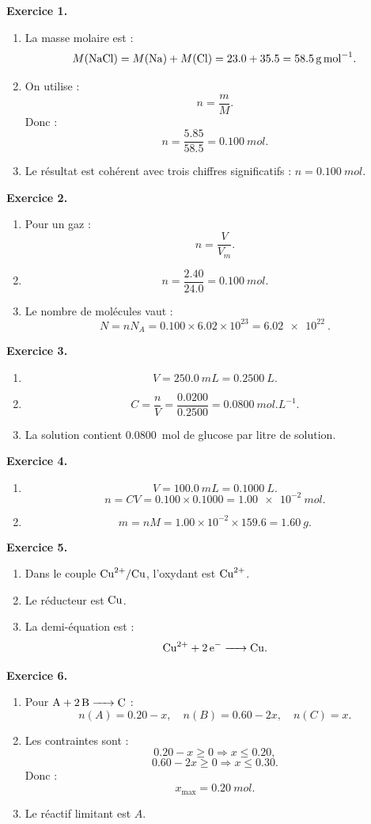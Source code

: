 \documentclass[11pt,a4paper]{article}
\newcommand{\corr}[2]{
  \begin{correctionbox}
  \textbf{Exercice #1.} #2
  \end{correctionbox}
}
\begin{document}
\corr{1}{
\begin{enumerate}
  \item La masse molaire est :
  \[
  M(\ce{NaCl})=M(\ce{Na})+M(\ce{Cl})=23.0+35.5=\SI{58.5}{g.mol^{-1}}.
  \]
  \item On utilise :
  \[
  n=\frac{m}{M}.
  \]
  Donc :
  \[
  n=\frac{5.85}{58.5}=\SI{0.100}{mol}.
  \]
  \item Le résultat est cohérent avec trois chiffres significatifs : $n=\SI{0.100}{mol}$.
\end{enumerate}
}

\corr{2}{
\begin{enumerate}
  \item Pour un gaz :
  \[
  n=\frac{V}{V_m}.
  \]
  \item
  \[
  n=\frac{2.40}{24.0}=\SI{0.100}{mol}.
  \]
  \item Le nombre de molécules vaut :
  \[
  N=nN_A=0.100\times 6.02\times 10^{23}=\SI{6.02e22}{}.
  \]
\end{enumerate}
}

\corr{3}{
\begin{enumerate}
  \item
  \[
  V=\SI{250.0}{mL}=\SI{0.2500}{L}.
  \]
  \item
  \[
  C=\frac{n}{V}=\frac{0.0200}{0.2500}=\SI{0.0800}{mol.L^{-1}}.
  \]
  \item La solution contient \SI{0.0800}{mol} de glucose par litre de solution.
\end{enumerate}
}

\corr{4}{
\begin{enumerate}
  \item
  \[
  V=\SI{100.0}{mL}=\SI{0.1000}{L}.
  \]
  \[
  n=CV=0.100\times 0.1000=\SI{1.00e-2}{mol}.
  \]
  \item
  \[
  m=nM=1.00\times 10^{-2}\times 159.6=\SI{1.60}{g}.
  \]
\end{enumerate}
}

\corr{5}{
\begin{enumerate}
  \item Dans le couple $\ce{Cu^{2+}/Cu}$, l'oxydant est $\ce{Cu^{2+}}$.
  \item Le réducteur est $\ce{Cu}$.
  \item La demi-équation est :
  \[
  \ce{Cu^{2+} + 2e- -> Cu}.
  \]
\end{enumerate}
}

\corr{6}{
\begin{enumerate}
  \item Pour $\ce{A + 2B -> C}$ :
  \[
  n(A)=0.20-x,\quad n(B)=0.60-2x,\quad n(C)=x.
  \]
  \item Les contraintes sont :
  \[
  0.20-x\geq 0 \Rightarrow x\leq 0.20,
  \]
  \[
  0.60-2x\geq 0 \Rightarrow x\leq 0.30.
  \]
  Donc :
  \[
  x_{\max}=\SI{0.20}{mol}.
  \]
  \item Le réactif limitant est $A$.
\end{enumerate}
}
\end{document}
